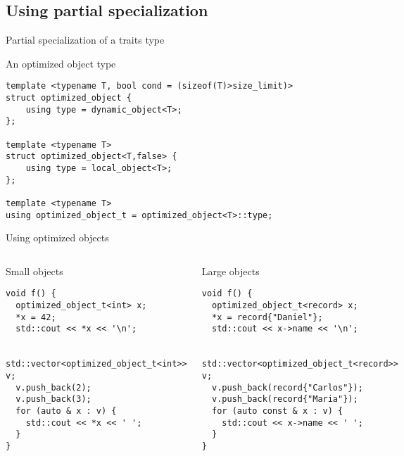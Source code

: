\subsection{Using partial specialization}

\begin{frame}[t,fragile]{Partial specialization of a traits type}
\begin{block}{An optimized object type}
\begin{lstlisting}
template <typename T, bool cond = (sizeof(T)>size_limit)>
struct optimized_object {
    using type = dynamic_object<T>;
};

template <typename T>
struct optimized_object<T,false> {
    using type = local_object<T>;
};

template <typename T>
using optimized_object_t = optimized_object<T>::type;
\end{lstlisting}
\end{block}
\end{frame}


\begin{frame}[t,fragile]{Using optimized objects}
\begin{columns}[T]

\begin{block}{Small objects}
\begin{lstlisting}
void f() {
  optimized_object_t<int> x;
  *x = 42;
  std::cout << *x << '\n';

  std::vector<optimized_object_t<int>> v;
  v.push_back(2);
  v.push_back(3);
  for (auto & x : v) {
    std::cout << *x << ' ';
  }
}
\end{lstlisting}
\end{block}

\begin{block}{Large objects}
\begin{lstlisting}
void f() {
  optimized_object_t<record> x;
  *x = record{"Daniel"};
  std::cout << x->name << '\n';

  std::vector<optimized_object_t<record>> v;
  v.push_back(record{"Carlos"});
  v.push_back(record{"Maria"});
  for (auto const & x : v) {
    std::cout << x->name << ' ';
  }
}
\end{lstlisting}
\end{block}

\end{columns}
\end{frame}
